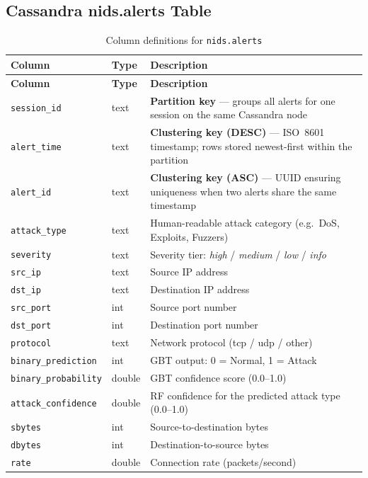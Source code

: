 \documentclass[12pt,a4paper]{report}
\begin{document}
\subsection{Cassandra nids.alerts Table}
\begin{longtable}{llp{6cm}}
  \caption{Column definitions for \texttt{nids.alerts}}
  \label{tab:alerts-cols} \\
  \toprule
  \textbf{Column} & \textbf{Type} & \textbf{Description} \\
  \midrule\endfirsthead
  \toprule
  \textbf{Column} & \textbf{Type} & \textbf{Description} \\
  \midrule\endhead
  \texttt{session\_id}      & text   & \textbf{Partition key} --- groups all
    alerts for one session on the same Cassandra node \\
  \texttt{alert\_time}      & text   & \textbf{Clustering key (DESC)} ---
    ISO~8601 timestamp; rows stored newest-first within the partition \\
  \texttt{alert\_id}        & text   & \textbf{Clustering key (ASC)} ---
    UUID ensuring uniqueness when two alerts share the same timestamp \\
  \texttt{attack\_type}     & text   & Human-readable attack category
    (e.g.\ DoS, Exploits, Fuzzers) \\
  \texttt{severity}         & text   & Severity tier: \textit{high} /
    \textit{medium} / \textit{low} / \textit{info} \\
  \texttt{src\_ip}          & text   & Source IP address \\
  \texttt{dst\_ip}          & text   & Destination IP address \\
  \texttt{src\_port}        & int    & Source port number \\
  \texttt{dst\_port}        & int    & Destination port number \\
  \texttt{protocol}         & text   & Network protocol (tcp / udp / other)\\
  \texttt{binary\_prediction}  & int    & GBT output: 0 = Normal, 1 = Attack\\
  \texttt{binary\_probability} & double & GBT confidence score (0.0--1.0) \\
  \texttt{attack\_confidence}  & double & RF confidence for the predicted
    attack type (0.0--1.0) \\
  \texttt{sbytes}           & int    & Source-to-destination bytes \\
  \texttt{dbytes}           & int    & Destination-to-source bytes \\
  \texttt{rate}             & double & Connection rate (packets/second) \\
  \bottomrule
\end{longtable}
\end{document}

